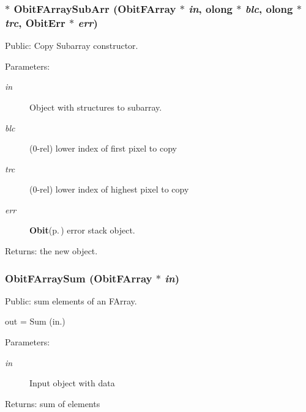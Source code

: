 \subsubsection{$\ast$ Obit\-FArray\-Sub\-Arr ({\bf Obit\-FArray} $\ast$ {\em in}, {\bf olong} $\ast$ {\em blc}, {\bf olong} $\ast$ {\em trc}, {\bf Obit\-Err} $\ast$ {\em err})}\label{ObitFArray_8h_a60}


Public: Copy Subarray constructor. 

\begin{Desc}
\item[Parameters:]
\begin{description}
\item[{\em in}]Object with structures to subarray. \item[{\em blc}](0-rel) lower index of first pixel to copy \item[{\em trc}](0-rel) lower index of highest pixel to copy \item[{\em err}]{\bf Obit}{\rm (p.\,\pageref{structObit})} error stack object. \end{description}
\end{Desc}
\begin{Desc}
\item[Returns:]the new object. \end{Desc}
\subsubsection{ Obit\-FArray\-Sum ({\bf Obit\-FArray} $\ast$ {\em in})}\label{ObitFArray_8h_a81}


Public: sum elements of an FArray. 

out = Sum (in.) \begin{Desc}
\item[Parameters:]
\begin{description}
\item[{\em in}]Input object with data \end{description}
\end{Desc}
\begin{Desc}
\item[Returns:]sum of elements \end{Desc}
